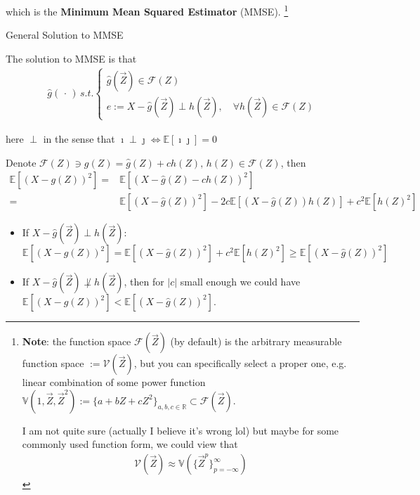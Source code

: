     which is the \textbf{Minimum Mean Squared Estimator} (MMSE). \footnote{\textbf{Note}: the function space $ \mathscr{F}(\vec{Z}) $ (by default) is the arbitrary measurable function space $ :=\mathscr{V}(\vec{Z}) $, but you can specifically select a proper one, e.g. linear combination of some power function $ \mathbb{V}(1,\vec{Z},\vec{Z}^2):=\{a+bZ+cZ^2\}_{a,b,c\in\mathbb{R}}\subset \mathscr{F}(\vec{Z}) $.
    
    I am not quite sure (actually I believe it's wrong lol) but maybe for some commonly used function form, we could view that
    \begin{align}
        \mathscr{V}(\vec{Z})\approx \mathbb{V}(\{\vec{Z}^p\}_{p=-\infty}^\infty) 
    \end{align}
    
    }

\begin{point}
    General Solution to MMSE
\end{point}

    The solution to MMSE is that
    \begin{align}
         \hat{g}(\, \cdot \, )\, s.t. \begin{cases}
            \hat{g}(\vec{Z})\in \mathscr{F}(Z)\\
            e:=X-\hat{g}(\vec{Z})\perp h(\vec{Z}),\quad \forall h(\vec{Z})\in\mathscr{F}(Z)
         \end{cases}
    \end{align}
    
    here $ \perp $ in the sense that $ \imath \perp \jmath \Leftrightarrow \mathbb{E}\left[ \imath\jmath \right]=0  $
    
        Denote $ \mathscr{F}(Z)\ni g(Z)=\hat{g}(Z)+c h(Z)  ,\,h(Z)\in\mathscr{F}(Z)$, then
        \begin{align}
            \mathbb{E}\left[ (X-g(Z))^2 \right]  =&\mathbb{E}\left[ (X-\hat{g}(Z)-ch(Z))^2 \right]\\
            =&\mathbb{E}\left[ (X-\hat{g}(Z))^2 \right] -2c\mathbb{E}\left[ (X-\hat{g}(Z))h(Z) \right]+c^2\mathbb{E}\left[ h(Z)^2 \right]  
        \end{align}
        
        \begin{itemize}[topsep=2pt,itemsep=0pt]
            \item If $ X-\hat{g}(\vec{Z})\perp h(\vec{Z})  $: $
                \mathbb{E}\left[ (X-g(Z))^2 \right]  =\mathbb{E}\left[ (X-\hat{g}(Z))^2 \right] +c^2\mathbb{E}\left[ h(Z)^2 \right]  \geq \mathbb{E}\left[ (X-\hat{g}(Z))^2 \right]$
            \item If $ X-\hat{g}(\vec{Z})\not\perp h(\vec{Z})  $, then for $ |c| $ small enough we could have $ \mathbb{E}\left[ (X-g(Z))^2 \right]< \mathbb{E}\left[ (X-\hat{g}(Z))^2 \right]$.          
        \end{itemize}
        
